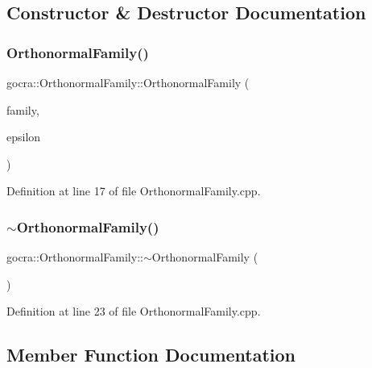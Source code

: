 \subsection{Constructor \& Destructor Documentation}
\hypertarget{classgocra_1_1OrthonormalFamily_a119f335434f7695b587a40d40c5117c8}{}\label{classgocra_1_1OrthonormalFamily_a119f335434f7695b587a40d40c5117c8} 
\subsubsection{\texorpdfstring{Orthonormal\+Family()}{OrthonormalFamily()}}
{\footnotesize\ttfamily gocra\+::\+Orthonormal\+Family\+::\+Orthonormal\+Family (\begin{DoxyParamCaption}\item[{const Eigen\+::\+Matrix\+Xd \&}]{family,  }\item[{const double}]{epsilon }\end{DoxyParamCaption})}



Definition at line 17 of file Orthonormal\+Family.\+cpp.

\hypertarget{classgocra_1_1OrthonormalFamily_a4c31a4a79ec5df60209cb7aa4a8e5306}{}\label{classgocra_1_1OrthonormalFamily_a4c31a4a79ec5df60209cb7aa4a8e5306} 
\subsubsection{\texorpdfstring{$\sim$\+Orthonormal\+Family()}{~OrthonormalFamily()}}
{\footnotesize\ttfamily gocra\+::\+Orthonormal\+Family\+::$\sim$\+Orthonormal\+Family (\begin{DoxyParamCaption}{ }\end{DoxyParamCaption})}



Definition at line 23 of file Orthonormal\+Family.\+cpp.



\subsection{Member Function Documentation}
\hypertarget{classgocra_1_1OrthonormalFamily_a8961a7be4e0c54ebe99bd416f6de4bc3}{}\label{classgocra_1_1OrthonormalFamily_a8961a7be4e0c54ebe99bd416f6de4bc3} 
